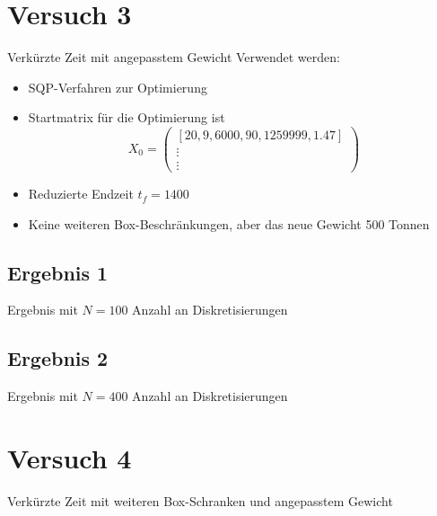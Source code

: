 \section{Versuch 3}
Verkürzte Zeit mit angepasstem Gewicht
Verwendet werden:
\begin{itemize}
\item SQP-Verfahren zur Optimierung 
\item Startmatrix für die Optimierung ist \[X_0 = \begin{pmatrix}
[20,9,6000,90,1259999,1.47] \\ 
\vdots \\ 
\vdots
\end{pmatrix}\]
\item Reduzierte Endzeit $t_f = 1400$
\item Keine weiteren Box-Beschränkungen, aber das neue Gewicht 500 Tonnen
\end{itemize}

\subsection{Ergebnis 1}
Ergebnis mit $N=100$ Anzahl an Diskretisierungen
 

\subsection{Ergebnis 2}
Ergebnis mit $N=400$ Anzahl an Diskretisierungen 














\section{Versuch 4}
Verkürzte Zeit mit weiteren Box-Schranken und angepasstem Gewicht

